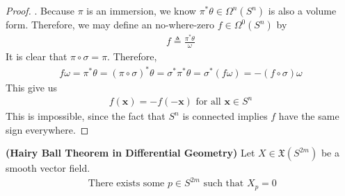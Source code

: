 \documentclass{report}
\begin{document}
\begin{proof}
. Because $\pi$ is an immersion, we know $\pi ^* \theta \in \Omega^n (S^n)$ is also a volume form. Therefore, we may define an no-where-zero $f\in \Omega^0(S^n)$ by 
\begin{align*}
f\triangleq \frac{\pi ^* \theta}{\omega }
\end{align*}
It is clear that $\pi \circ \sigma= \pi  $. Therefore, 
\begin{align*}
  f\omega= \pi ^* \theta= (\pi  \circ  \sigma)^* \theta= \sigma^* \pi ^* \theta= \sigma^* (f \omega)= -(f \circ \sigma)\omega 
\end{align*}
This give us 
\begin{align*}
f(\textbf{x})=-f(-\textbf{x})\text{ for all }\textbf{x}\in S^n
\end{align*}
This is impossible, since the fact that $S^n$ is connected implies  $f$ have the same sign everywhere. \CaC 
\end{proof}
\begin{theorem}
\label{HBT}
\textbf{(Hairy Ball Theorem in Differential Geometry)} Let  $X\in \mathfrak{X}(S^{2m})$ be a smooth vector field. 
\begin{align*}
\text{ There exists some $p  \in S^{2m}$ such that }X_p=0
\end{align*}
\end{theorem}
\end{document}
